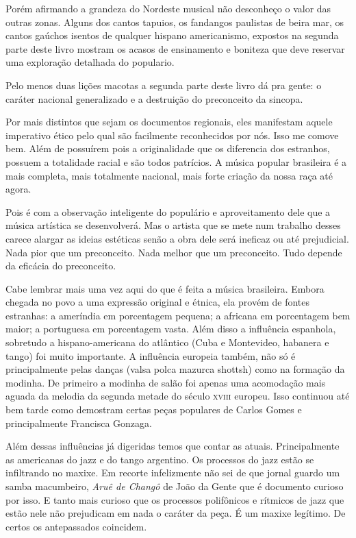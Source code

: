 Porém afirmando a grandeza do Nordeste musical não desconheço o valor
das outras zonas. Alguns dos cantos tapuios, os fandangos paulistas de
beira mar, os cantos gaúchos isentos de qualquer hispano americanismo,
expostos na segunda parte deste livro mostram os acasos de ensinamento e
boniteza que deve reservar uma exploração detalhada do populario.

Pelo menos duas lições macotas a segunda parte deste livro dá pra gente:
o caráter nacional generalizado e a destruição do preconceito da
sincopa.

Por mais distintos que sejam os documentos regionais, eles manifestam
aquele imperativo ético pelo qual são facilmente reconhecidos por nós.
Isso me comove bem. Além de possuírem pois a originalidade que os
diferencia dos estranhos, possuem a totalidade racial e são todos
patrícios. A música popular brasileira é a mais completa, mais
totalmente nacional, mais forte criação da nossa raça até agora.

Pois é com a observação inteligente do populário e aproveitamento dele
que a música artística se desenvolverá. Mas o artista que se mete num
trabalho desses carece alargar as ideias estéticas senão a obra dele
será ineficaz ou até prejudicial. Nada pior que um preconceito. Nada
melhor que um preconceito. Tudo depende da eficácia do preconceito.

Cabe lembrar mais uma vez aqui do que é feita a música brasileira.
Embora chegada no povo a uma expressão original e étnica, ela provém de
fontes estranhas: a ameríndia em porcentagem pequena; a africana em
porcentagem bem maior; a portuguesa em porcentagem vasta. Além disso a
influência espanhola, sobretudo a hispano-americana do atlântico (Cuba e
Montevideo, habanera e tango) foi muito importante. A influência
europeia também, não só é principalmente pelas danças (valsa polca
mazurca shottsh) como na formação da modinha. De primeiro a modinha de
salão foi apenas uma acomodação mais aguada da melodia da segunda metade
do século \textsc{xviii} europeu. Isso continuou até bem tarde como demostram
certas peças populares de Carlos Gomes e principalmente Francisca
Gonzaga.

Além dessas influências já digeridas temos que contar as atuais.
Principalmente as americanas do jazz e do tango argentino. Os processos
do jazz estão se infiltrando no maxixe. Em recorte infelizmente não sei
de que jornal guardo um samba macumbeiro, \emph{Aruê de Changô} de João
da Gente que é documento curioso por isso. E tanto mais curioso que os
processos polifônicos e rítmicos de jazz que estão nele não prejudicam
em nada o caráter da peça. É um maxixe legítimo. De certos os
antepassados coincidem.

